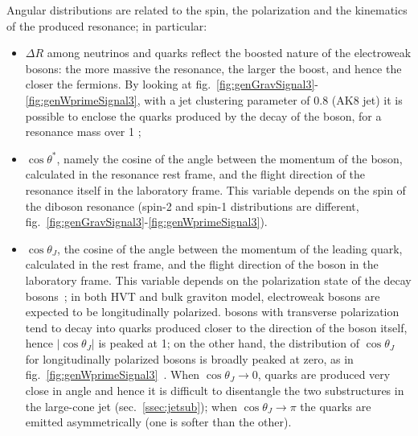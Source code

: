 \noindent Angular distributions are related to the spin, the polarization and the kinematics of the produced resonance; in particular:
\begin{itemize}
\item $\Delta R$ among neutrinos and quarks reflect the boosted nature of the electroweak bosons: the more massive the resonance, the larger the boost, and hence the closer the fermions. By looking at fig.~\ref{fig:genGravSignal3}-\ref{fig:genWprimeSignal3}, with a jet clustering parameter of 0.8 (AK8 jet) it is possible to enclose the quarks produced by the decay of the \V boson, for a resonance mass over 1 \TeV;
\item $\cos{\theta}^{*}$, namely the cosine of the angle between the momentum of the \V boson, calculated in the resonance rest frame, and the flight direction of the resonance itself in the laboratory frame. This variable depends on the spin of the diboson resonance (spin-2 and spin-1 distributions are different, fig.~\ref{fig:genGravSignal3}-\ref{fig:genWprimeSignal3}). %
\item $\cos{\theta}_J$, the cosine of the angle between the momentum of the leading quark, calculated in the \V rest frame, and the flight direction of the \V boson in the laboratory frame. This variable depends on the polarization state of the decay bosons~\cite{Khachatryan:2014vla}; in both HVT and bulk graviton model, electroweak bosons are expected to be longitudinally polarized. \W bosons with transverse polarization tend to decay into quarks produced closer to the direction of the boson itself, hence $\left| \cos{\theta}_J \right|$ is peaked at 1; on the other hand, the distribution of $\cos{\theta}_J$ for longitudinally polarized \W bosons is broadly peaked at zero, as in fig.~\ref{fig:genWprimeSignal3}~\cite{Bolognesi:2012mm}. When $\cos{\theta}_J \rightarrow 0$, quarks are produced very close in angle and hence it is difficult to disentangle the two substructures in the large-cone jet (sec.~\ref{ssec:jetsub}); when $\cos{\theta}_J \rightarrow \pi$ the quarks are emitted asymmetrically (one is softer than the other).%
\end{itemize}
 


